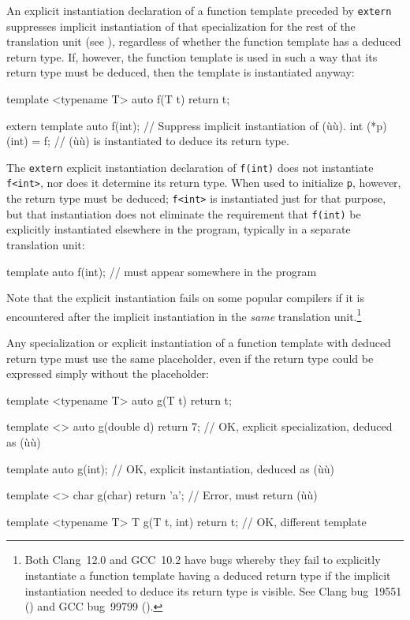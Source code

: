 An explicit instantiation declaration of a function template preceded by
\lstinline!extern! suppresses implicit instantiation of that specialization
for the rest of the translation unit (see
), regardless of whether the function
template has a deduced return type. If, however, the function template
is used in such a way that its return type must be deduced, then the
template is instantiated anyway:

\begin{emcppslisting}[emcppsbatch=e4,emcppsstandards={c++14}]
template <typename T> auto f(T t) { return t; }

extern template auto f(int);  // Suppress implicit instantiation of (ù{}ù).
int (*p)(int) = f;            // (ù{}ù) is instantiated to deduce its return type.
\end{emcppslisting}
    

\noindent The \lstinline!extern! explicit instantiation declaration of
\lstinline!f(int)! does not instantiate \lstinline!f<int>!, nor does it
determine its return type. When used to initialize \lstinline!p!, however,
the return type must be deduced; \lstinline!f<int>! is instantiated just
for that purpose, but that instantiation does not eliminate the
requirement that \lstinline!f(int)! be explicitly instantiated elsewhere in
the program, typically in a separate translation unit:

\begin{emcppslisting}[emcppsbatch=e4,emcppserrorlines=1]
template auto f(int); // must appear somewhere in the program
\end{emcppslisting}
    

\noindent Note that the explicit instantiation fails on some popular compilers if
it is encountered after the implicit instantiation in the \emph{same}
translation unit.{\cprotect\footnote{Both Clang~12.0 and GCC~10.2 have
bugs whereby they fail to explicitly instantiate a function template
having a deduced return type if the implicit instantiation needed to
deduce its return type is visible. See Clang bug~19551
(\cite{halpern21b}) and GCC bug~99799
  (\cite{halpern21a}).}}

Any specialization or explicit instantiation of a function template with
deduced return type must use the same placeholder, even if the return
type could be expressed simply without the placeholder:

\begin{emcppslisting}[emcppsstandards={c++14},emcppserrorlines={8}]
template <typename T> auto g(T t) { return t; }

template <>
auto g(double d) { return 7; }  // OK, explicit specialization, deduced as (ù{}ù)

template auto g(int);           // OK, explicit instantiation, deduced as (ù{}ù)

template <>
char g(char)   { return 'a'; }  // Error, must return (ù{}ù)

template <typename T>
T    g(T t, int) { return t; }  // OK, different template
\end{emcppslisting}
    

